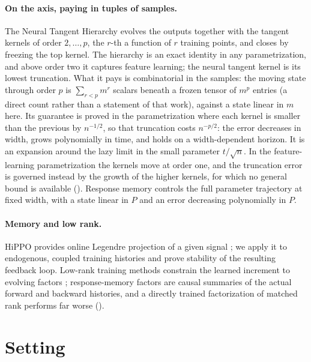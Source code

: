 \documentclass[11pt]{article}
\theoremstyle{definition}
\theoremstyle{remark}
\begin{document}
\paragraph{On the axis, paying in tuples of samples.}
The Neural Tangent Hierarchy \citep{huang2020nth} evolves the outputs together
with the tangent kernels of order $2,\dots,p$, the $r$-th a function of $r$
training points, and closes by freezing the top kernel.  The hierarchy is an
exact identity in any parametrization, and above order two it captures feature
learning; the neural tangent kernel is its lowest truncation.  What it pays is
combinatorial in the samples: the moving state through order $p$ is
$\sum_{r<p}m^r$ scalars beneath a frozen tensor of $m^p$ entries (a direct
count rather than a statement of that work), against a state linear in $m$
here.  Its guarantee is proved in the parametrization where each kernel is
smaller than the previous by $n^{-1/2}$, so that truncation costs $n^{-p/2}$:
the error decreases in width, grows polynomially in time, and holds on a
width-dependent horizon.  It is an expansion around the lazy limit in the small
parameter $t/\sqrt n$.  In the feature-learning parametrization the kernels move
at order one, and the truncation error is governed instead by the growth of the
higher kernels, for which no general bound is available ().
Response memory controls the full parameter trajectory at fixed width, with a
state linear in $P$ and an error decreasing polynomially in $P$.

\paragraph{Memory and low rank.}
HiPPO provides online Legendre projection of a given signal \citep{gu2020hippo};
we apply it to endogenous, coupled training histories and prove stability of the
resulting feedback loop.  Low-rank training methods constrain the learned
increment to evolving factors \citep{zhao2023inrank}; response-memory factors are
causal summaries of the actual forward and backward histories, and a directly
trained factorization of matched rank performs far worse
().

\section{Setting}
\label{sec:setting}
\end{document}
